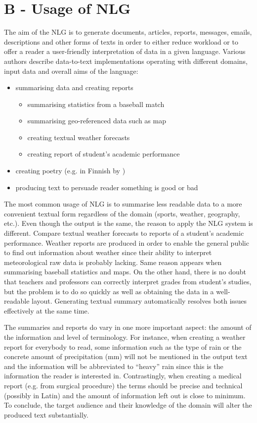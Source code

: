 \section{B - Usage of NLG}
The aim of the NLG is to generate documents, articles, reports, messages, emails, descriptions and other forms of texts in order to either reduce workload or to offer a reader a user-friendly interpretation of data in a given language. Various authors describe data-to-text implementations operating with different domains, input data and overall aims of the language:
\begin{itemize}
	\item summarising data and creating reports 
	\begin{itemize}
		\item summarising statistics from a baseball match \cite{puduppully2022data}
		\item summarising geo-referenced data such as map \cite{thomas2007atlas}
		\item creating textual weather forecasts \cite{sripada2014case}
		\item creating report of student's academic performance \cite{}
	\end{itemize}
	\item creating poetry (e.g. in Finnish by \cite{hamalainen2018harnessing})
	\item producing text to persuade reader something is good or bad \cite{carenini2006generating}
\end{itemize}

The most common usage of NLG is to summarise less readable data to a more convenient textual form regardless of the domain (sports, weather, geography, etc.). Even though the output is the same, the reason to apply the NLG system is different. Compare textual weather forecasts to reports of a student's academic performance. Weather reports are produced in order to enable the general public to find out information about weather since their ability to interpret meteorological raw data is probably lacking. Same reason appears when summarising baseball statistics and maps. On the other hand, there is no doubt that teachers and professors can correctly interpret grades from student’s studies, but the problem is to do so quickly as well as obtaining the data in a well-readable layout. Generating textual summary automatically resolves both issues effectively at the same time.

The summaries and reports do vary in one more important aspect: the amount of the information and level of terminology. For instance, when creating a weather report for everybody to read,  some information such as the type of rain or the concrete amount of  precipitation (mm) will not be mentioned in the output text and the information will be abbreviated to “heavy” rain since this is the information the reader is interested in. Contrastingly, when creating a medical report (e.g. from surgical procedure) the terms should be precise and technical (possibly in Latin) and the amount of information left out is close to minimum. To conclude, the target audience and their knowledge of the domain will alter the produced text substantially.

